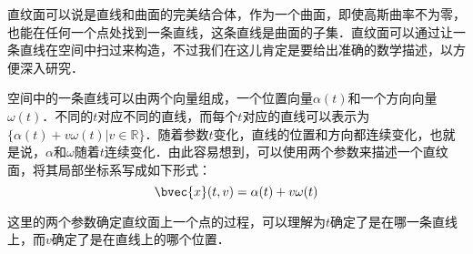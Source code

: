 
直纹面可以说是直线和曲面的完美结合体，作为一个曲面，即使高斯曲率不为零，也能在任何一个点处找到一条直线，这条直线是曲面的子集．直纹面可以通过让一条直线在空间中扫过来构造，不过我们在这儿肯定是要给出准确的数学描述，以方便深入研究．

空间中的一条直线可以由两个向量组成，一个位置向量$\alpha(t)$和一个方向向量$\omega(t)$．不同的$t$对应不同的直线，而每个$t$对应的直线可以表示为$\{\alpha(t)+v\omega(t)|v\in\mathbb{R}\}$．随着参数$t$变化，直线的位置和方向都连续变化，也就是说，$\alpha$和$\omega$随着$t$连续变化．由此容易想到，可以使用两个参数来描述一个直纹面，将其局部坐标系写成如下形式：
\begin{equation}
\bvec{x}(t, v)=\alpha(t)+v\omega(t)
\end{equation}

这里的两个参数确定直纹面上一个点的过程，可以理解为$t$确定了是在哪一条直线上，而$v$确定了是在直线上的哪个位置．









